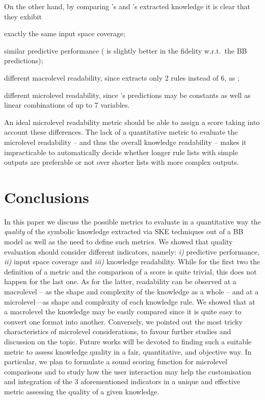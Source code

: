 \documentclass[sigconf]{acmart}
\begin{document}
On the other hand, by comparing \cart{}'s and \creepy{}'s extracted knowledge it is clear that they exhibit
%
\begin{inlinelist}
	\item exactly the same input space coverage;
	\item similar predictive performance (\creepy{} is slightly better in the fidelity w.r.t.\ the BB predictions);
	\item different macrolevel readability, since \creepy{} extracts only 2 rules instead of 6, as \cart{};
	\item different microlevel readability, since \creepy{}'s predictions may be constants as well as linear combinations of up to 7 variables.
\end{inlinelist} 
%
An ideal microlevel readability metric should be able to assign a score taking into account these differences.
%
The lack of a quantitative metric to evaluate the microlevel readability -- and thus the overall knowledge readability -- makes it impracticable to automatically decide whether longer rule lists with simple outputs are preferable or not over shorter lists with more complex outputs.

\section{Conclusions}

In this paper we discuss the possible metrics to evaluate in a quantitative way the \emph{quality} of the symbolic knowledge extracted via SKE techniques out of a BB model as well as the need to define such metrics.
%
We showed that quality evaluation should consider different indicators, namely: \textit{i)} predictive performance, \textit{ii)} input space coverage and \textit{iii)} knowledge readability.
%
While for the first two the definition of a metric and the comparison of a score is quite trivial, this does not happen for the last one.
%
As for the latter, readability can be observed at a macrolevel -- as the shape and complexity of the knowledge as a whole -- and at a microlevel---as shape and complexity of each knowledge rule.
%
We showed that at a macrolevel the knowledge may be easily compared since it is quite easy to convert one format into another.
%
Conversely, we pointed out the most tricky characteristics of microlevel considerations, to favour further studies and discussion on the topic.
%
Future works will be devoted to finding such a suitable metric to assess knowledge quality in a fair, quantitative, and objective way.
%
In particular, we plan to formulate a sound scoring function for microlevel comparisons and to study how the user interaction may help the customisation and integration of the 3 aforementioned indicators in a unique and effective metric assessing the quality of a given knowledge.
\end{document}
